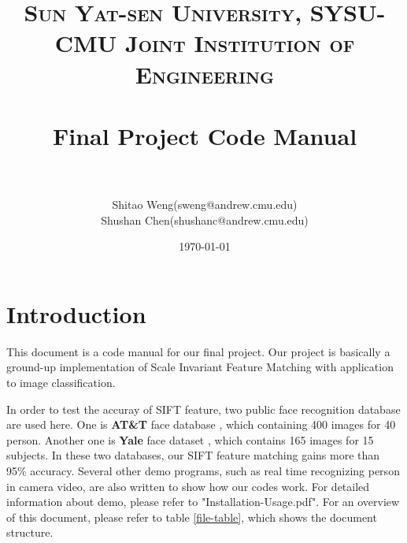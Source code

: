 \documentclass[paper=a4, fontsize=11pt]{scrartcl} %
\title{	
\normalfont \normalsize 
\textsc{Sun Yat-sen University, SYSU-CMU Joint Institution of Engineering} \\ [25pt] %
\horrule{0.5pt} \\[0.4cm] %
\huge Final Project Code Manual\\ %
\horrule{2pt} \\[0.5cm] %
}
\author{Shitao Weng(sweng@andrew.cmu.edu) \\ Shushan Chen(shushanc@andrew.cmu.edu)} %
\date{\normalsize\today} %
\numberwithin{equation}{section} %
\numberwithin{figure}{section} %
\numberwithin{table}{section} %
\begin{document}
\maketitle %

\tableofcontents 

\clearpage

\section{Introduction}

This document is a code manual for our final project. Our project is basically a ground-up implementation of Scale Invariant Feature Matching with application to image classification.

In order to test the accuray of SIFT feature, two public face recognition database are used here. One is \textbf{AT\&T} face database \cite{att}, which containing 400 images for 40 person. Another one is \textbf{Yale} face dataset \cite{yale}, which contains 165 images for 15 subjects. In these two databases, our SIFT feature matching gains more than 95\% accuracy. Several other demo programs, such as real time recognizing person in camera video, are also written to show how our codes work. For detailed information about demo, please refer to "Installation-Usage.pdf". For an overview of this document, please refer to table \ref{file-table}, which shows the document structure.
\end{document}
